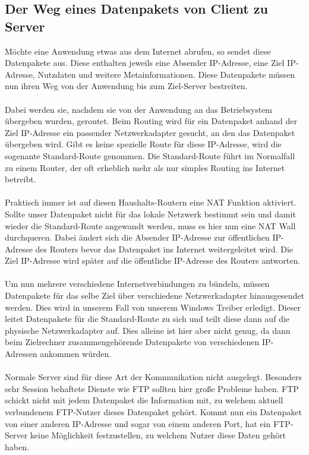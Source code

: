 \subsection{Der Weg eines Datenpakets von Client zu Server}
Möchte eine Anwendung etwas aus dem Internet abrufen, so sendet diese Datenpakete aus. Diese enthalten jeweils eine Absender IP-Adresse, eine Ziel IP-Adresse, Nutzdaten und weitere Metainformationen. Diese Datenpakete müssen nun ihren Weg von der Anwendung bis zum Ziel-Server bestreiten. 
\\\\
Dabei werden sie, nachdem sie von der Anwendung an das Betriebsystem übergeben wurden, geroutet. Beim Routing wird für ein Datenpaket anhand der Ziel IP-Adresse ein passender Netzwerkadapter gesucht, an den das Datenpaket übergeben wird. Gibt es keine spezielle Route für diese IP-Adresse, wird die sogenante Standard-Route genommen. Die Standard-Route führt im Normalfall zu einem Router, der oft erheblich mehr als nur simples Routing ins Internet betreibt. 
\\\\
Praktisch immer ist auf diesen Haushalts-Routern eine NAT Funktion aktiviert. Sollte unser Datenpaket nicht für das lokale Netzwerk bestimmt sein und damit wieder die Standard-Route angewandt werden, muss es hier nun eine NAT Wall durchqueren. Dabei ändert sich die Absender IP-Adresse zur öffentlichen IP-Adresse des Routers bevor das Datenpaket ins Internet weitergeleitet wird. Die Ziel IP-Adresse wird später auf die öffentliche IP-Adresse des Routers antworten.
\\\\
Um nun mehrere verschiedene Internetverbindungen zu bündeln, müssen  Datenpakete für das selbe Ziel über verschiedene Netzwerkadapter hinausgesendet werden. Dies wird in unserem Fall von unserem Windows Treiber erledigt. Dieser leitet Datenpakete für die Standard-Route zu sich und teilt diese dann auf die physische Netzwerkadapter auf. Dies alleine ist hier aber nicht genug, da dann beim Zielrechner zusammengehörende Datenpakete von verschiedenen IP-Adressen ankommen würden. 
\\\\
Normale Server sind für diese Art der Kommunikation nicht ausgelegt. Besonders sehr Session behaftete Dienste wie FTP sollten hier große  Probleme haben. FTP schickt nicht mit jedem Datenpaket die Information mit, zu welchem aktuell verbundenem FTP-Nutzer dieses Datenpaket gehört. Kommt nun ein Datenpaket von einer anderen IP-Adresse und sogar von einem anderen Port, hat ein FTP-Server keine Möglichkeit festzustellen, zu welchem Nutzer diese Daten gehört haben. 
